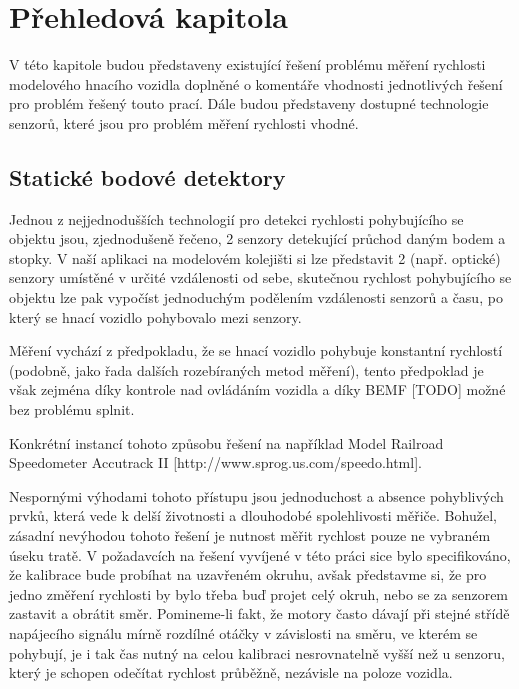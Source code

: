 \documentclass[12pt,a4paper]{article}
\begin{document}
\pagestyle{empty}
\noindent


\section{Přehledová kapitola}

V této kapitole budou představeny existující řešení problému měření rychlosti
modelového hnacího vozidla doplněné o komentáře vhodnosti jednotlivých řešení
pro problém řešený touto prací. Dále budou představeny dostupné technologie
senzorů, které jsou pro problém měření rychlosti vhodné.

\subsection{Statické bodové detektory}

Jednou z nejjednodušších technologií pro detekci rychlosti pohybujícího se
objektu jsou, zjednodušeně řečeno, 2 senzory detekující průchod daným bodem
a stopky. V naší aplikaci na modelovém kolejišti si lze představit 2
(např. optické) senzory umístěné v určité vzdálenosti od sebe, skutečnou
rychlost pohybujícího se objektu lze pak vypočíst jednoduchým podělením
vzdálenosti senzorů a času, po který se hnací vozidlo pohybovalo mezi senzory.

Měření vychází z předpokladu, že se hnací vozidlo pohybuje konstantní
rychlostí (podobně, jako řada dalších rozebíraných metod měření), tento
předpoklad je však zejména díky kontrole nad ovládáním vozidla a díky BEMF
[TODO] možné bez problému splnit.

Konkrétní instancí tohoto způsobu řešení na například Model Railroad Speedometer
Accutrack II [http://www.sprog.us.com/speedo.html].

Nespornými výhodami tohoto přístupu jsou jednoduchost a absence pohyblivých
prvků, která vede k delší životnosti a dlouhodobé spolehlivosti měřiče. Bohužel,
zásadní nevýhodou tohoto řešení je nutnost měřit rychlost pouze ne vybraném
úseku tratě. V požadavcích na řešení vyvíjené v této práci sice bylo specifikováno,
že kalibrace bude probíhat na uzavřeném okruhu, avšak představme si, že pro
jedno změření rychlosti by bylo třeba buď projet celý okruh, nebo se za senzorem
zastavit a obrátit směr. Pomineme-li fakt, že motory často dávají při stejné
střídě napájecího signálu mírně rozdílné otáčky v závislosti na směru, ve
kterém se pohybují, je i tak čas nutný na celou kalibraci nesrovnatelně vyšší
než u senzoru, který je schopen odečítat rychlost průběžně, nezávisle na
poloze vozidla.
\end{document}
